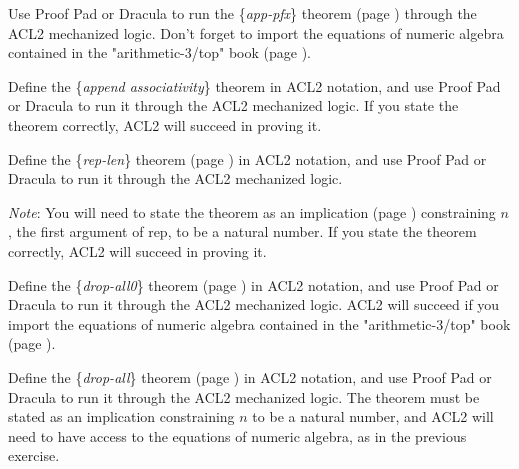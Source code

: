 \begin{ExerciseList}
\Exercise Use Proof Pad or Dracula to run the \{\emph{app-pfx}\} theorem
(page \pageref{app-pfx-thm}) through the ACL2 mechanized logic.
Don't forget to import the equations of numeric algebra
contained in the "arithmetic-3/top" book (page \pageref{arith-top-book}).

\Exercise Define the \{\emph{append associativity}\} theorem in ACL2 notation,
and use Proof Pad or Dracula to run it through the ACL2 mechanized logic.
If you state the theorem correctly, ACL2 will succeed in proving it.

\Exercise Define the \{\emph{rep-len}\} theorem (page \pageref{rep-len}) in ACL2 notation,
and use Proof Pad or Dracula to run it through the ACL2 mechanized logic.

\emph{Note}: You will need to state the theorem as an implication (page \pageref{implies-def})
constraining $n$, the first argument of rep, to be a natural number.
If you state the theorem correctly, ACL2 will succeed in proving it.

\Exercise Define the \{\emph{drop-all0}\} theorem (page \pageref{drop-all0}) in ACL2 notation,
and use Proof Pad or Dracula to run it through the ACL2 mechanized logic.
ACL2 will succeed if you import the equations of numeric algebra
contained in the "arithmetic-3/top" book (page \pageref{arith-top-book}).

\Exercise Define the \{\emph{drop-all}\} theorem (page \pageref{drop-all}) in ACL2 notation,
and use Proof Pad or Dracula to run it through the ACL2 mechanized logic.
The theorem must be stated as an implication constraining $n$ to be a natural number,
and ACL2 will need to have access to the equations of numeric algebra,
as in the previous exercise.

\end{ExerciseList}


